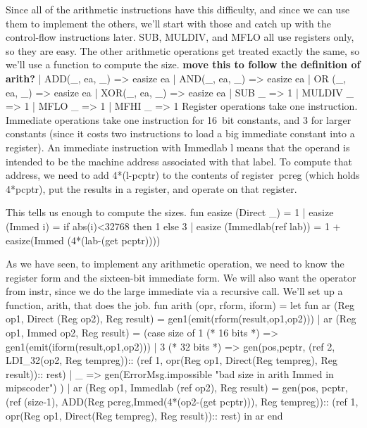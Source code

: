 Since all of the arithmetic instructions have this difficulty, and since
we can use them to implement the others, we'll start with those and
catch up with the control-flow instructions later.
\enddocs
{}
\code{}SUB\edoc{}, \code{}MULDIV\edoc{}, and \code{}MFLO\edoc{} all use registers only, so they are easy.
The other arithmetic operations get treated exactly the same, so we'll
use a function to compute the size.
{\bf move this to follow the definition of \code{}arith\edoc{}?}
\enddocs
{}
\endmoddef
| ADD(_, ea, _) => easize ea
| AND(_, ea, _) => easize ea
| OR (_, ea, _) => easize ea
| XOR(_, ea, _) => easize ea
| SUB _ => 1
| MULDIV _ => 1 
| MFLO _ => 1
| MFHI _ => 1
\endcode
{}
Register operations take one instruction.
Immediate operations take one instruction for 16~bit constants,
and 3 for larger constants (since it costs two instructions to load
a big immediate constant into a register).
An immediate instruction with \code{}Immedlab l\edoc{} means that the operand
is intended to be the machine address associated with that label.
To compute that address, we need to add 
\code{}4*(l-pcptr)\edoc{} to the contents of 
register~\code{}pcreg\edoc{} (which holds \code{}4*pcptr\edoc{}), 
put the results in a register, and operate on that register.

This tells us enough to compute the sizes.
\enddocs
{}
\endmoddef
fun easize (Direct _) = 1
  | easize (Immed i) = if abs(i)<32768 then 1 else 3
  | easize (Immedlab(ref lab)) = 1 + easize(Immed (4*(lab-(get pcptr))))
\endcode
{}

As we have seen, 
to implement any arithmetic operation, we need to know the register 
form and the sixteen-bit immediate form.
We will also want the operator from \code{}instr\edoc{}, since we do the
large immediate via a recursive call.
We'll set up a function, \code{}arith\edoc{}, that does the job.
\enddocs
{}
\endmoddef
fun arith (opr, rform, iform) =
   let fun ar (Reg op1, Direct (Reg op2), Reg result) = 
                gen1(emit(rform(result,op1,op2)))
         | ar (Reg op1, Immed op2, Reg result) =
                (case size of
                    1 (* 16 bits *) => gen1(emit(iform(result,op1,op2)))
                  | 3 (* 32 bits *) => 
                     gen(pos,pcptr,
                          (ref 2, LDI_32(op2, Reg tempreg))::
                          (ref 1, opr(Reg op1, Direct(Reg tempreg), Reg result))::
                          rest)
                  | _ => gen(ErrorMsg.impossible 
                                "bad size in arith Immed in mipscoder")
                )
         | ar (Reg op1, Immedlab (ref op2), Reg result) =
                gen(pos, pcptr, 
                      (ref (size-1), 
                            ADD(Reg pcreg,Immed(4*(op2-(get pcptr))), Reg tempreg))::
                      (ref 1, opr(Reg op1, Direct(Reg tempreg), Reg result))::
                      rest)
   in  ar
   end
\endcode
{}

